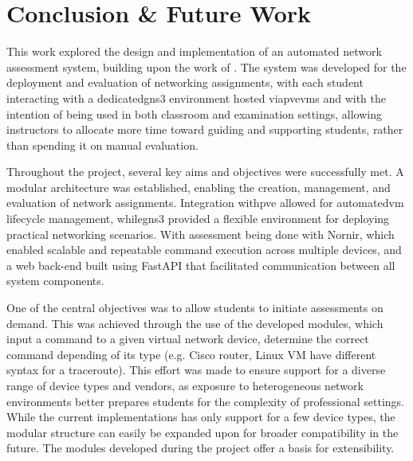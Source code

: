 
\chapter{Conclusion \& Future Work}


\label{Chapter7ConclusionFutureWork}

This work explored the design and implementation of an automated network assessment system, building upon the work of 
\citet{santos2024}. The system was developed for the deployment and evaluation of networking assignments, with each 
student interacting with a dedicated\ac{gns3} environment hosted via\ac{pve}\ac{vm}s and with the intention of being used 
in both classroom and examination settings, allowing instructors to allocate more time toward guiding and supporting 
students, rather than spending it on manual evaluation.

Throughout the project, several key aims and objectives were successfully met. A modular architecture was established, 
enabling the creation, management, and evaluation of network assignments. Integration with\ac{pve} allowed for 
automated\ac{vm} lifecycle management, while\ac{gns3} provided a flexible environment for deploying practical networking 
scenarios. With assessment being done with Nornir, which enabled scalable and repeatable command execution across multiple 
devices, and a web back-end built using FastAPI that facilitated communication between all system components.

One of the central objectives was to allow students to initiate assessments on demand. This was achieved through the use of 
the developed modules, which input a command to a given virtual network device, determine the correct command depending of 
its type (e.g. Cisco router, Linux VM have different syntax for a traceroute). This effort was made to ensure support for a 
diverse range of device types and vendors, as exposure to heterogeneous network environments better prepares students for 
the complexity of professional settings. While the current implementations has only support for a few device types, the 
modular structure can easily be expanded upon for broader compatibility in the future. The modules developed during the 
project offer a basis for extensibility.

